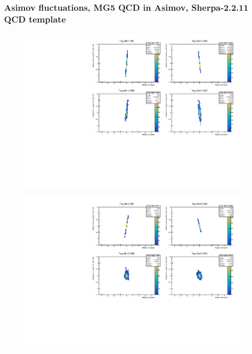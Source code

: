 \subsubsection{\mjj Asimov fluctuations, MG5 QCD in Asimov, Sherpa-2.2.11 QCD template}
\begin{figure}[H]
\includegraphics[width=\textwidth]{plots/diffx/instab/constfx/instabilities_mjj_QCD_Sh2211_Signal_Sh2211_BSDATASTATS_madgraphasimov_bin1.pdf}
\end{figure}
\begin{figure}[H]
\includegraphics[width=\textwidth]{plots/diffx/instab/constfx/instabilities_mjj_QCD_Sh2211_Signal_Sh2211_BSDATASTATS_madgraphasimov_bin2.pdf}
\end{figure}
